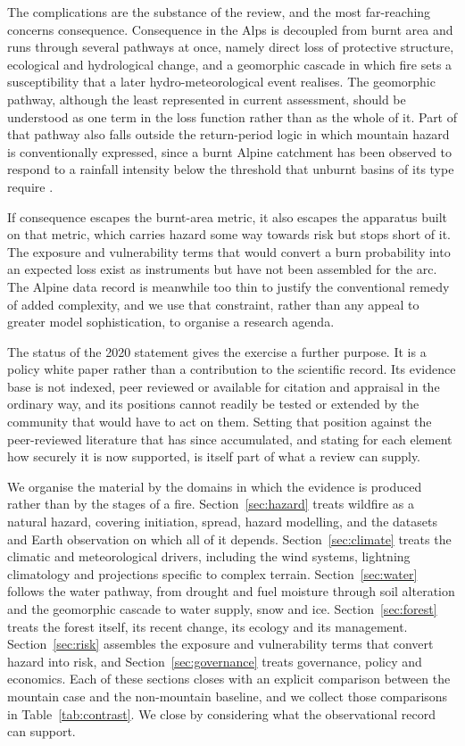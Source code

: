 \documentclass[11pt,a4paper]{article}
\begin{document}
The complications are the substance of the review, and the most far-reaching concerns consequence. Consequence in the Alps is decoupled from burnt area and runs through several pathways at once, namely direct loss of protective structure, ecological and hydrological change, and a geomorphic cascade in which fire sets a susceptibility that a later hydro-meteorological event realises. The geomorphic pathway, although the least represented in current assessment, should be understood as one term in the loss function rather than as the whole of it. Part of that pathway also falls outside the return-period logic in which mountain hazard is conventionally expressed, since a burnt Alpine catchment has been observed to respond to a rainfall intensity below the threshold that unburnt basins of its type require \citep{laporta_postwildfire_2025}.

If consequence escapes the burnt-area metric, it also escapes the apparatus built on that metric, which carries hazard some way towards risk but stops short of it. The exposure and vulnerability terms that would convert a burn probability into an expected loss exist as instruments but have not been assembled for the arc. The Alpine data record is meanwhile too thin to justify the conventional remedy of added complexity, and we use that constraint, rather than any appeal to greater model sophistication, to organise a research agenda.

The status of the 2020 statement gives the exercise a further purpose. It is a policy white paper rather than a contribution to the scientific record. Its evidence base is not indexed, peer reviewed or available for citation and appraisal in the ordinary way, and its positions cannot readily be tested or extended by the community that would have to act on them. Setting that position against the peer-reviewed literature that has since accumulated, and stating for each element how securely it is now supported, is itself part of what a review can supply.

We organise the material by the domains in which the evidence is produced rather than by the stages of a fire. Section~\ref{sec:hazard} treats wildfire as a natural hazard, covering initiation, spread, hazard modelling, and the datasets and Earth observation on which all of it depends. Section~\ref{sec:climate} treats the climatic and meteorological drivers, including the wind systems, lightning climatology and projections specific to complex terrain. Section~\ref{sec:water} follows the water pathway, from drought and fuel moisture through soil alteration and the geomorphic cascade to water supply, snow and ice. Section~\ref{sec:forest} treats the forest itself, its recent change, its ecology and its management. Section~\ref{sec:risk} assembles the exposure and vulnerability terms that convert hazard into risk, and Section~\ref{sec:governance} treats governance, policy and economics. Each of these sections closes with an explicit comparison between the mountain case and the non-mountain baseline, and we collect those comparisons in Table~\ref{tab:contrast}. We close by considering what the observational record can support.
\end{document}
